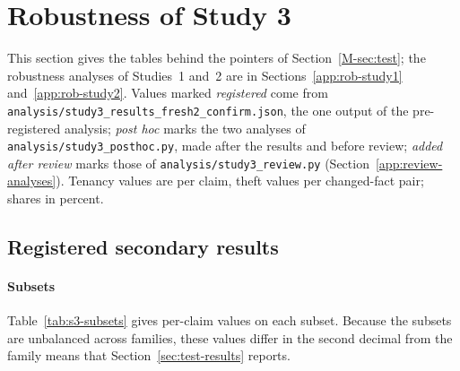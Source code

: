 \section{Robustness of Study 3}
\label{app:robustness}
\label{app:rob-study3}

This section gives the tables behind the pointers of Section~\ref{M-sec:test}; the robustness analyses of Studies~1 and~2 are in Sections~\ref{app:rob-study1} and~\ref{app:rob-study2}. Values marked \emph{registered} come from \texttt{analysis/\allowbreak{}study3\_\allowbreak{}results\_\allowbreak{}fresh2\_\allowbreak{}confirm.json}, the one output of the pre-registered analysis; \emph{post hoc} marks the two analyses of \texttt{analysis/\allowbreak{}study3\_\allowbreak{}posthoc.py}, made after the results and before review; \emph{added after review} marks those of \texttt{analysis/\allowbreak{}study3\_\allowbreak{}review.py} (Section~\ref{app:review-analyses}). Tenancy values are per claim, theft values per changed-fact pair; shares in percent.

\subsection{Registered secondary results}

\paragraph{Subsets}
Table~\ref{tab:s3-subsets} gives per-claim values on each subset. Because the subsets are unbalanced across families, these values differ in the second decimal from the family means that Section~\ref{sec:test-results} reports.

